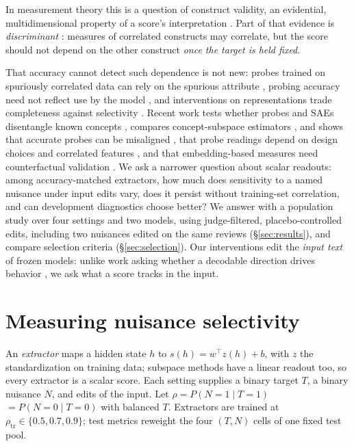 \documentclass[11pt]{article}
\newcommand{\rhot}{\rho_{\text{tr}}}
\begin{document}
In measurement theory this is a question of construct validity, an evidential, multidimensional property of a score's interpretation \citep{cronbach1955construct,messick1995validity,jacobs2021measurement,bean2025measuring}. Part of that evidence is \emph{discriminant} \citep{campbell1959convergent}: measures of correlated constructs may correlate, but the score should not depend on the other construct \emph{once the target is held fixed}.

That accuracy cannot detect such dependence is not new: probes trained on spuriously correlated data can rely on the spurious attribute \citep{kumar2022probing}, probing accuracy need not reflect use by the model \citep{hewitt2019designing,ravichander2021probing,elazar2021amnesic,tiwari2026decodability,sudheendra2026decodability}, and interventions on representations trade completeness against selectivity \citep{canby2025reliable,huang2024ravel}. Recent work tests whether probes and SAEs disentangle known concepts \citep{mueller2026isolation}, compares concept-subspace estimators \citep{naowarat2026framework}, and shows that accurate probes can be misaligned \citep{lysnaeslarsen2025probing}, that probe readings depend on design choices \citep{noel2026probe} and correlated features \citep{shen2026beyond}, and that embedding-based measures need counterfactual validation \citep{li2026proxy}. We ask a narrower question about scalar readouts: among accuracy-matched extractors, how much does sensitivity to a named nuisance under input edits vary, does it persist without training-set correlation, and can development diagnostics choose better? We answer with a population study over four settings and two models, using judge-filtered, placebo-controlled edits, including two nuisances edited on the same reviews (\S\ref{sec:results}), and compare selection criteria (\S\ref{sec:selection}). Our interventions edit the \emph{input text} of frozen models: unlike work asking whether a decodable direction drives behavior \citep{tiwari2026decodability,sudheendra2026decodability}, we ask what a score tracks in the input.

\section{Measuring nuisance selectivity}
\label{sec:battery}

An \emph{extractor} maps a hidden state $h$ to $s(h)=w^\top z(h)+b$, with $z$ the standardization on training data; subspace methods have a linear readout too, so every extractor is a scalar score. Each setting supplies a binary target $T$, a binary nuisance $N$, and edits of the input. Let \mbox{$\rho=P(N{=}1\mid T{=}1)$} \mbox{${}=P(N{=}0\mid T{=}0)$} with balanced $T$. Extractors are trained at $\rhot\in\{0.5,0.7,0.9\}$; test metrics reweight the four $(T,N)$ cells of one fixed test pool.
\end{document}
